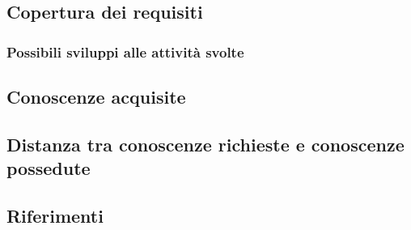 \subsection{Copertura dei requisiti}
\label{4.1}

\subsubsection{Possibili sviluppi alle attività svolte}
\subsection{Conoscenze acquisite}

\label{4.2}
\subsection{Distanza tra conoscenze richieste e conoscenze possedute}

\label{4.3}
\newpage

\printglossaries
{}
\label{5.0}

\newpage
\subsection*{Riferimenti}
\label{6.0}
\newpage





